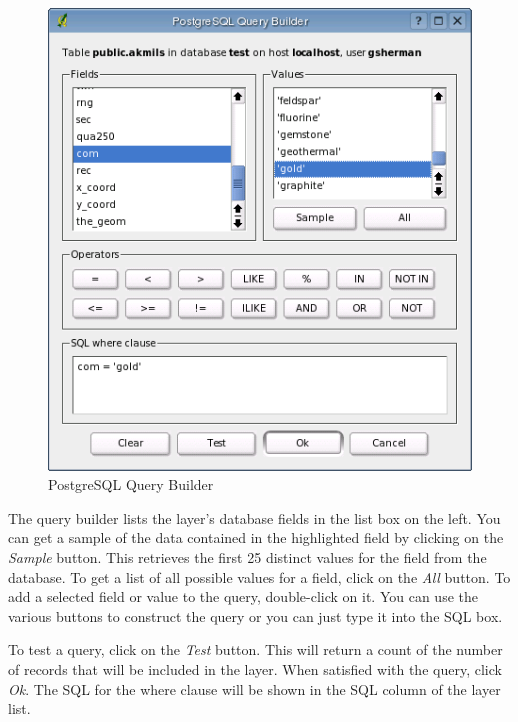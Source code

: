 \begin{figure}[h]
  \begin{center}
    \caption{PostgreSQL Query Builder}\label{fig:query_builder}\smallskip
    \includegraphics[scale=.6]{qgis_user_guide_images/querybuilder}
  \end{center}  
\end{figure}

The query builder lists the layer's database
fields in the list box on the left.  You can get a sample of the data contained
in the highlighted field by clicking on the \textit{Sample} button. This
retrieves the first 25 distinct values for the field from the database. To get a
list of all possible values for a field, click on the \textit{All}
button. To
add a selected field or value to the query, double-click on it. You can use the
various buttons to construct the query or you can just type it into the SQL box.

To test a query, click on the \textit{Test} button. This will return a count of
the number of records that will be included in the layer. When satisfied with
the query, click \textit{Ok}. The SQL for the where clause will be shown in the
SQL column of the layer list.


